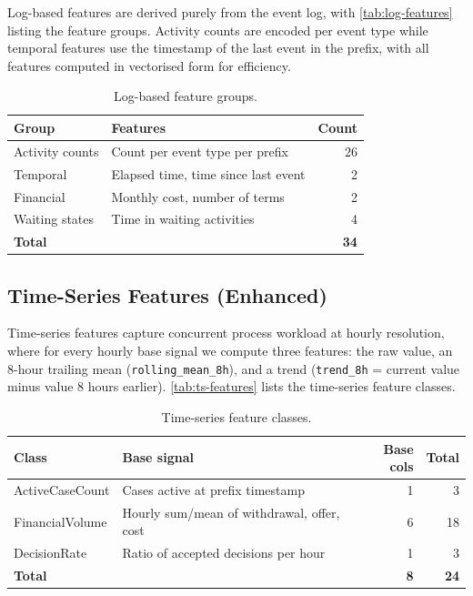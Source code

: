 \documentclass[runningheads]{llncs}
\begin{document}
Log-based features are derived purely from the event log, with \autoref{tab:log-features}
listing the feature groups. Activity counts are encoded per event type
while temporal features use the timestamp of the last event in the prefix, with all
features computed in vectorised form for efficiency.

\begin{table}[t]
    \centering
    \caption{Log-based feature groups.}
    \label{tab:log-features}
    \begin{tabular}{lp{5cm}r}
        \toprule
        Group & Features & Count \\
        \midrule
        Activity counts & Count per event type per prefix      & 26 \\
        Temporal        & Elapsed time, time since last event   & 2 \\
        Financial       & Monthly cost, number of terms         & 2 \\
        Waiting states  & Time in waiting activities            & 4 \\
        \midrule
        \textbf{Total}  &                                       & \textbf{34} \\
        \bottomrule
    \end{tabular}
\end{table}

\subsection{Time-Series Features (Enhanced)}
\label{sec:ts-features}

Time-series features capture concurrent process workload at hourly
resolution, where for every hourly base signal we compute three features: the
raw value, an 8-hour trailing mean (\texttt{rolling\_mean\_8h}), and a
trend (\texttt{trend\_8h} = current value minus value 8 hours earlier).
\autoref{tab:ts-features} lists the time-series feature classes.

\begin{table}[t]
    \centering
    \caption{Time-series feature classes.}
    \label{tab:ts-features}
    \begin{tabular}{lp{5cm}rr}
        \toprule
        Class & Base signal & Base cols & Total \\
        \midrule
        ActiveCaseCount & Cases active at prefix timestamp            & 1 & 3 \\
        FinancialVolume & Hourly sum/mean of withdrawal, offer, cost  & 6 & 18 \\
        DecisionRate    & Ratio of accepted decisions per hour        & 1 & 3 \\
        \midrule
        \textbf{Total}  &                                             & \textbf{8} & \textbf{24} \\
        \bottomrule
    \end{tabular}
\end{table}
\end{document}
